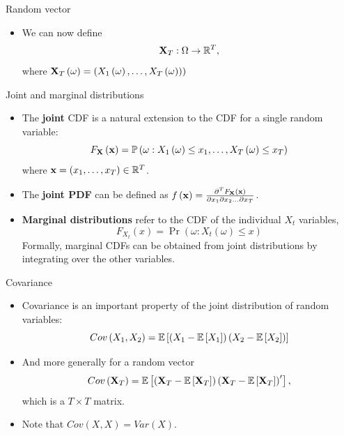 \begin{frame}{Random vector}
\begin{itemize}
	\item We can now define\[
	{\bf X}_T: \Omega \rightarrow \mathbb{R}^T,
\]
where ${\bf X}_T\left(\omega\right) = \left(X_1\left(\omega\right),\dots,X_T\left(\omega)\right)\right)$
\end{itemize}
\end{frame}



\begin{frame}{Joint and marginal distributions}
\begin{itemize}
\item The {\bf joint} CDF is a natural extension to the CDF for a single random variable:\[
		F_{{\bf X}} \left({\bf x}\right) = \Pr\left(\omega: X_1\left(\omega\right)\le x_1, \dots , X_T\left(\omega\right)\le x_T\right)
	\]
where ${\bf x} = \left(x_1,\dots,x_T\right)\in \mathbb{R}^T$.

\smallskip
\item The {\bf joint PDF} can be defined as $f\left( {\bf x} \right) = \frac{\partial^T F_{{\bf X}} \left({\bf x}\right)}{\partial x_1 \partial x_2 \dots \partial x_T}$.

\smallskip
\item {\bf Marginal distributions} refer to the CDF of the individual $X_t$ variables,\[
		F_{X_t} \left(x\right) = \Pr\left(\omega: X_t\left(\omega\right)\le x \right)
		\]
	Formally, marginal CDFs can be obtained  from joint distributions by integrating
		over the other variables. 


\end{itemize}
\end{frame}


\begin{frame}{Covariance}
\begin{itemize}
	\item Covariance is an important property of the joint distribution of random variables:\[
		Cov\left(X_1,X_2\right) = \E\left[ \left( X_1 - \E\left[X_1\right]\right) \left( X_2 - \E\left[X_2\right]\right)\right]
	\]

	\item And more generally for a random vector\[
		Cov\left({\bf X}_T\right) =\E\left[ \left( {\bf X}_T - \E\left[{\bf X}_T\right]\right) \left( {\bf X}_T - \E\left[{\bf X}_T\right]\right)'\right],
	\]
	which is a $T\times T$ matrix. 

	\item Note that $Cov\left(X,X\right) = Var\left(X\right)$.
\end{itemize}
\end{frame}




